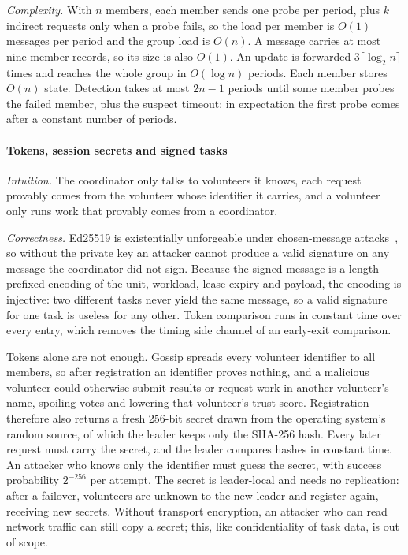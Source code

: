 \emph{Complexity.} With $n$ members, each member sends one probe per period, plus $k$ indirect requests only when a probe fails, so the load per member is $O(1)$ messages per period and the group load is $O(n)$. A message carries at most nine member records, so its size is also $O(1)$. An update is forwarded $3\lceil\log_2 n\rceil$ times and reaches the whole group in $O(\log n)$ periods. Each member stores $O(n)$ state. Detection takes at most $2n-1$ periods until some member probes the failed member, plus the suspect timeout; in expectation the first probe comes after a constant number of periods.

\paragraph{Tokens, session secrets and signed tasks}
\emph{Intuition.} The coordinator only talks to volunteers it knows, each request provably comes from the volunteer whose identifier it carries, and a volunteer only runs work that provably comes from a coordinator.

\emph{Correctness.} Ed25519 is existentially unforgeable under chosen-message attacks~\cite{bernstein2012ed25519}, so without the private key an attacker cannot produce a valid signature on any message the coordinator did not sign. Because the signed message is a length-prefixed encoding of the unit, workload, lease expiry and payload, the encoding is injective: two different tasks never yield the same message, so a valid signature for one task is useless for any other. Token comparison runs in constant time over every entry, which removes the timing side channel of an early-exit comparison.

Tokens alone are not enough. Gossip spreads every volunteer identifier to all members, so after registration an identifier proves nothing, and a malicious volunteer could otherwise submit results or request work in another volunteer's name, spoiling votes and lowering that volunteer's trust score. Registration therefore also returns a fresh 256-bit secret drawn from the operating system's random source, of which the leader keeps only the SHA-256 hash. Every later request must carry the secret, and the leader compares hashes in constant time. An attacker who knows only the identifier must guess the secret, with success probability $2^{-256}$ per attempt. The secret is leader-local and needs no replication: after a failover, volunteers are unknown to the new leader and register again, receiving new secrets. Without transport encryption, an attacker who can read network traffic can still copy a secret; this, like confidentiality of task data, is out of scope.

